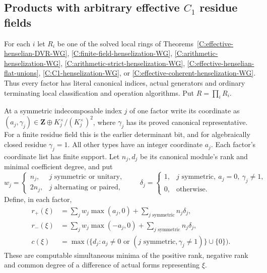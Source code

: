 \subsection{Products with arbitrary effective $C_1$ residue fields}
\label{C:C1-coherent-products-subsection}

\begin{theorem}
\label{C:C1-coherent-products-WG}
For each $i$ let $R_i$ be one of the solved local
rings of Theorems~\ref{C:effective-henselian-DVR-WG},
\ref{C:finite-field-henselization-WG},
\ref{C:arithmetic-henselization-WG},
\ref{C:arithmetic-strict-henselization-WG},
\ref{C:effective-henselian-flat-unions},
\ref{C:C1-henselization-WG}, or
\ref{C:effective-coherent-henselization-WG}.
Thus every factor has literal canonical indices,
actual generators and ordinary terminating local
classification and operation algorithms.
Put $R=\prod_iR_i$.

At a symmetric indecomposable index $j$ of
one factor write its coordinate as
$(a_j,\gamma_j)\in
\mathbf Z\oplus K_j^\times/(K_j^\times)^2$,
where $\gamma_j$ has its proved canonical
representative.  For a finite residue field
this is the earlier determinant bit, and
for algebraically closed residue
$\gamma_j=1$.
All other types have an integer coordinate
$a_j$.  Each factor's coordinate list has
finite support.
Let $n_j,d_j$ be its canonical module's
rank and minimal coefficient degree, and put
\[
 w_j=\begin{cases}
 n_j,&j\text{ symmetric or unitary},\\
 2n_j,&j\text{ alternating or paired},
 \end{cases}
 \qquad
 \delta_j=\begin{cases}
 1,&j\text{ symmetric},\ a_j=0,\ \gamma_j\ne1,\\
 0,&\text{otherwise}.
 \end{cases}                                             \tag{C.3.CP1}
\]
Define, in each factor,
\[
 \begin{split}
 r_+(\xi)&=\sum_jw_j\max(a_j,0)
                +\sum_{j\text{ symmetric}}n_j\delta_j,\\
 r_-(\xi)&=\sum_jw_j\max(-a_j,0)
                +\sum_{j\text{ symmetric}}n_j\delta_j,\\
 c(\xi)&=\max\bigl(\{d_j:a_j\ne0\text{ or }
                   (j\text{ symmetric},\gamma_j\ne1)\}\cup\{0\}\bigr).
 \end{split}                                             \tag{C.3.CP2}
\]
These are computable simultaneous minima of the
positive rank, negative rank and common degree
of a difference of actual forms representing
$\xi$.


\end{theorem}
